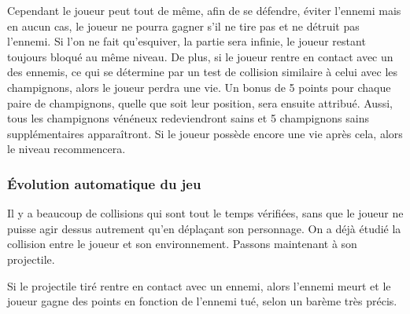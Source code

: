 
Cependant le joueur peut tout de même, afin de se défendre, éviter l'ennemi mais en aucun cas, le joueur ne pourra gagner s'il ne tire pas et ne détruit pas l'ennemi. Si l'on ne fait qu'esquiver, la partie sera infinie, le joueur restant toujours bloqué au même niveau. De plus, si le joueur rentre en contact avec un des ennemis, ce qui se détermine par un test de collision similaire à celui avec les champignons, alors le joueur perdra une vie. Un bonus de 5 points pour chaque paire de champignons, quelle que soit leur position, sera ensuite attribué. Aussi, tous les champignons vénéneux redeviendront sains et 5 champignons sains supplémentaires apparaîtront. Si le joueur possède encore une vie après cela, alors le niveau recommencera. 

\subsubsection{Évolution automatique du jeu}

Il y a beaucoup de collisions qui sont tout le temps vérifiées, sans que le joueur ne puisse agir dessus autrement qu'en déplaçant son personnage. On a déjà étudié la collision entre le joueur et son environnement. Passons maintenant à son projectile.

Si le projectile tiré rentre en contact avec un ennemi, alors l'ennemi meurt et le joueur gagne des points en fonction de l'ennemi tué, selon un barème très précis.

